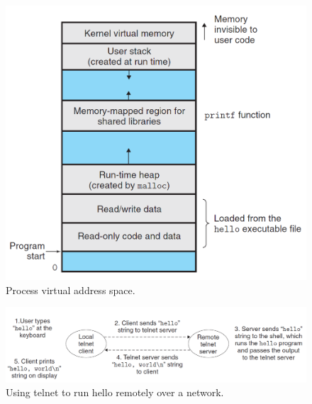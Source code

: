 \begin{figure}[h!]
    \centering
    \includegraphics[scale=0.5]{pic/section12/pic7.png}
    \caption{Process virtual address space.}
\end{figure}

\begin{figure}[h!]
    \centering
    \includegraphics[scale=0.4]{pic/section12/pic8.png}
    \caption{Using telnet to run hello remotely over a network.}
\end{figure}

